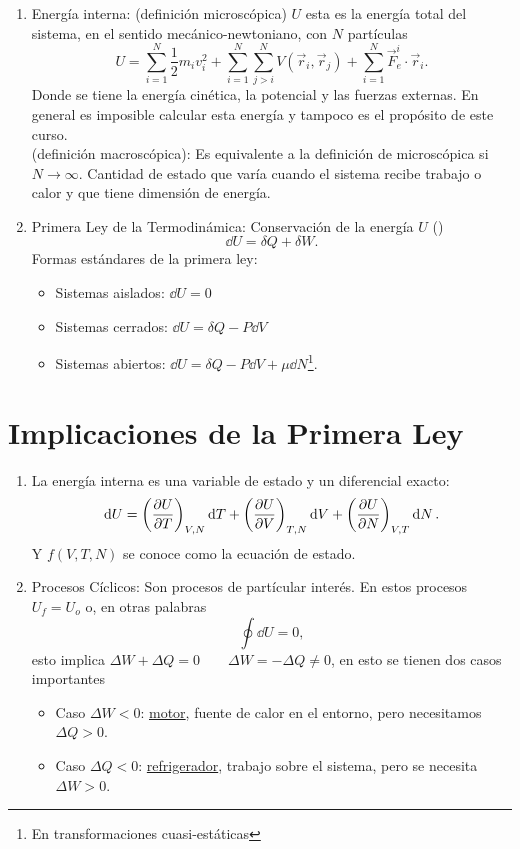 \begin{enumerate}
	\item Energía interna: (definición microscópica) $U$ esta es la energía total del sistema, en el sentido mecánico-newtoniano, con  $N$ partículas
		$$ U = \sum _{i=1} ^N \frac{1}{2} m_i v_i ^2 + \sum _{i=1} ^N \sum _{j > i} ^N V(\vec{r}_i ,\vec{r}_j) + \sum _{i=1} ^N \vec{F} _e ^i \cdot \vec{r}_i . $$
	Donde se tiene la energía cinética, la potencial y las fuerzas externas. En general es imposible calcular esta energía y tampoco es el propósito de este curso.  \\
	(definición macroscópica): Es equivalente a la definición de microscópica si $N\to \infty$. Cantidad de estado que varía cuando el sistema recibe trabajo o calor y que tiene dimensión de energía.
	\item Primera Ley de la Termodinámica: Conservación de la energía $U$ () 
		$$ \dd{U} = \delta Q + \delta W. $$
	Formas estándares de la primera ley:
	\begin{itemize}
		\item Sistemas aislados: $\dd{U} = 0$
		\item Sistemas cerrados: $\dd{U} = \delta Q - P\dd{V}$
		\item Sistemas abiertos: $\dd{U} = \delta Q - P\dd{V} + \mu \dd{N}$\footnote{En transformaciones cuasi-estáticas}.
	\end{itemize}
\end{enumerate}


\section{Implicaciones de la Primera Ley}

\begin{enumerate}
	\item La energía interna es una variable de estado y un diferencial exacto:
		$$ \dd{U} = \qty(\pdv{U}{T})_{V,N} \dd{T} + \qty(\pdv{U}{V})_{T,N} \dd{V} + \qty(\pdv{U}{N})_{V,T} \dd{N}. $$
		Y $f(V,T,N)$ se conoce como la ecuación de estado.
	\item Procesos Cíclicos: Son procesos de partícular interés. En estos procesos $U_f = U_o$ o, en otras palabras
		$$ \oint \dd{U} = 0, $$
	esto implica $\Delta W + \Delta Q = 0 \qquad \Delta W = - \Delta Q \neq 0$, en esto se tienen dos casos importantes
		\begin{itemize}
			\item Caso $\Delta W < 0$: \underline{motor}, fuente de calor en el entorno, pero necesitamos $\Delta Q > 0$.
			\item Caso $\Delta Q < 0$: \underline{refrigerador}, trabajo sobre el sistema, pero se necesita $\Delta W > 0$.
		\end{itemize}
\end{enumerate}


